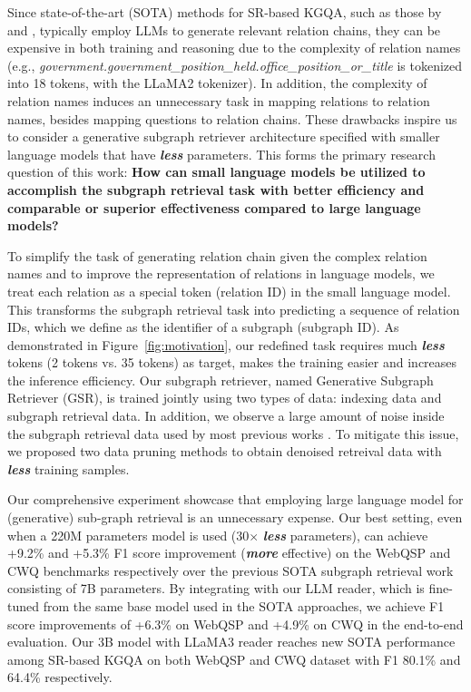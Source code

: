 \documentclass[11pt]{article}
\begin{document}
Since state-of-the-art (SOTA) methods for SR-based KGQA, such as those by \citet{luo2024reasoning} and \citet{sun2024thinkongraph}, typically employ LLMs to generate relevant relation chains,  they can be expensive in both training and reasoning due to the complexity of relation names (e.g., \textit{government.\-government\_position\_held.office\_position\_or\_title} is tokenized into 18 tokens, with the LLaMA2 tokenizer). In addition, the complexity of relation names induces an unnecessary task in mapping relations to relation names, besides mapping questions to relation chains. 
These drawbacks inspire us to consider a generative subgraph retriever architecture specified with smaller language models that have \textbf{\emph{less}} parameters. This forms the primary research question of this work: \textbf{How can small language models be utilized to accomplish the subgraph retrieval task with better efficiency and comparable or superior effectiveness compared to large language models?}

To simplify the task of generating relation chain given the complex relation names and to improve the representation of relations in language models, we treat each relation as a special token (relation ID) in the small language model. This transforms the subgraph retrieval task into predicting a sequence of relation IDs, which we define as the identifier of a subgraph (subgraph ID). As demonstrated in Figure~\ref{fig:motivation}, our redefined task requires much \textbf{\emph{less}} tokens (2 tokens vs. 35 tokens) as target, makes the training easier and increases the inference efficiency.
Our subgraph retriever, named Generative Subgraph Retriever (GSR), is trained jointly using two types of data: indexing data and subgraph retrieval data. In addition, we observe a large amount of noise inside the subgraph retrieval data used by most previous works \citep{zhang-etal-2022-subgraph, luo2024reasoning}. To mitigate this issue, we proposed two data pruning methods to obtain denoised retreival data with \textbf{\emph{less}} training samples.




Our comprehensive experiment showcase that employing large language model for (generative) sub-graph retrieval is an unnecessary expense. Our best setting, even when a 220M parameters model is used (30$\times$ \textbf{\emph{less}} parameters), can achieve +9.2\% and +5.3\% F1 score improvement (\textbf{\emph{more}} effective) on the WebQSP and CWQ benchmarks respectively over the previous SOTA subgraph retrieval work \citep{luo2024reasoning} consisting of 7B parameters. By integrating with our LLM reader, which is fine-tuned from the same base model used in the SOTA approaches, we achieve F1 score improvements of +6.3\% on WebQSP and +4.9\% on CWQ in the end-to-end evaluation. Our 3B model with LLaMA3 reader reaches new SOTA performance among SR-based KGQA on both WebQSP and CWQ dataset with F1 80.1\% and 64.4\% respectively.
\end{document}
